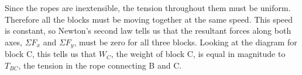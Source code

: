 \documentclass[../classical_mechanics.tex]{subfiles}
\begin{document}
\begin{example}
\begin{figure}[H]
            \end{figure}
            Since the ropes are inextensible, the tension throughout them must be uniform.
            Therefore all the blocks must be moving together at the same speed.
            This speed is constant, so Newton's second law tells us that the resultant forces along both axes, $\Sigma F_x$ and $\Sigma F_y$, must be zero for all three blocks.
            Looking at the diagram for block C, this tells us that $W_C$, the weight of block C, is equal in magnitude to $T_{BC}$, the tension in the rope connecting B and C.


\end{example}
\end{document}
